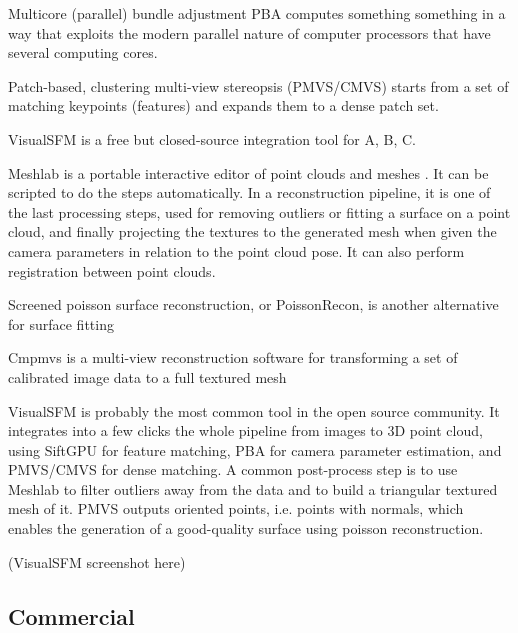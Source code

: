 Multicore (parallel) bundle adjustment PBA computes something something in a way that exploits the modern parallel nature of computer processors that have several computing cores. \cite{wu2011multicore}

Patch-based, clustering multi-view stereopsis (PMVS/CMVS) starts from a set of matching keypoints (features) and expands them to a dense patch set. \cite{furukawa2010accurate,furukawa2012patch}

VisualSFM is a free but closed-source integration tool for A, B, C.

Meshlab is a portable interactive editor of point clouds and meshes \cite{meshlab}.
It can be scripted to do the steps automatically.
In a reconstruction pipeline, it is one of the last processing steps, used for removing outliers or fitting a surface on a point cloud, and finally projecting the textures to the generated mesh when given the camera parameters in relation to the point cloud pose.
It can also perform registration between point clouds.

Screened poisson surface reconstruction, or PoissonRecon, is another alternative for surface fitting \cite{poissonrecon}

Cmpmvs is a multi-view reconstruction software for transforming a set of calibrated image data to a full textured mesh
\cite{jancosek2011multi}

VisualSFM is probably the most common tool in the open source community.
It integrates into a few clicks the whole pipeline from images to 3D point cloud, using SiftGPU for feature matching, PBA for camera parameter estimation, and PMVS/CMVS for dense matching.
A common post-process step is to use Meshlab to filter outliers away from the data and to build a triangular textured mesh of it. PMVS outputs oriented points, i.e. points with normals, which enables the generation of a good-quality surface using poisson reconstruction.

(VisualSFM screenshot here)

\subsection{Commercial}
